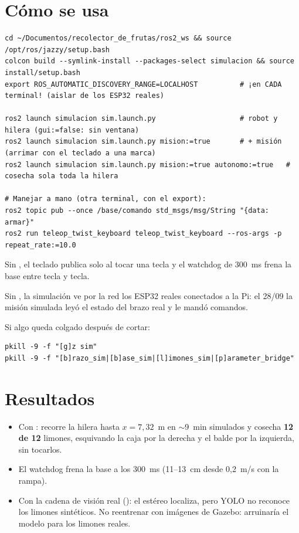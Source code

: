 \section{Cómo se usa}

\begin{lstlisting}[language=consola]
cd ~/Documentos/recolector_de_frutas/ros2_ws && source /opt/ros/jazzy/setup.bash
colcon build --symlink-install --packages-select simulacion && source install/setup.bash
export ROS_AUTOMATIC_DISCOVERY_RANGE=LOCALHOST          # ¡en CADA terminal! (aislar de los ESP32 reales)

ros2 launch simulacion sim.launch.py                    # robot y hilera (gui:=false: sin ventana)
ros2 launch simulacion sim.launch.py mision:=true       # + misión (arrimar con el teclado a una marca)
ros2 launch simulacion sim.launch.py mision:=true autonomo:=true   # cosecha sola toda la hilera

# Manejar a mano (otra terminal, con el export):
ros2 topic pub --once /base/comando std_msgs/msg/String "{data: armar}"
ros2 run teleop_twist_keyboard teleop_twist_keyboard --ros-args -p repeat_rate:=10.0
\end{lstlisting}

\begin{nota}
Sin , el teclado publica solo al tocar una tecla y el watchdog de 300~ms frena la base entre
tecla y tecla.
\end{nota}

\begin{peligro}
Sin , la simulación ve por la red los ESP32 reales conectados a la Pi:
el 28/09 la misión simulada leyó el estado del brazo real y le mandó comandos.
\end{peligro}

Si algo queda colgado después de cortar:
\begin{lstlisting}[language=consola]
pkill -9 -f "[g]z sim"
pkill -9 -f "[b]razo_sim|[b]ase_sim|[l]imones_sim|[p]arameter_bridge"
\end{lstlisting}

\section{Resultados}
\begin{itemize}
  \item Con : recorre la hilera hasta $x = 7{,}32$~m en $\sim$9~min simulados y
        cosecha \textbf{12 de 12} limones, esquivando la caja por la derecha y el balde por la izquierda, sin tocarlos.
  \item El watchdog frena la base a los 300~ms (11--13~cm desde 0,2~m/s con la rampa).
  \item Con la cadena de visión real (): el estéreo localiza, pero YOLO no reconoce los limones
        sintéticos. No reentrenar con imágenes de Gazebo: arruinaría el modelo para los limones reales.
\end{itemize}

